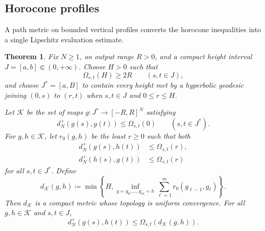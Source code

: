 \documentclass{amsart}
\numberwithin{equation}{section}
\theoremstyle{plain}
\newtheorem{theorem}{Theorem}[section]
\theoremstyle{definition}
\theoremstyle{remark}
\begin{document}
\subsection{Horocone profiles}

A path metric on bounded vertical profiles converts the horocone inequalities into a single Lipschitz evaluation estimate.

\begin{theorem}\label{thm:profile-path-metric}
Fix $N\ge1$, an output range $R>0$, and a compact height interval $J=[a,b]\Subset(0,+\infty)$.  Choose $H>0$ such that
\begin{equation}\label{eq:H-output-cutoff} \Omega_{s,t}(H)\ge2R \qquad(s,t\in J), \end{equation}
and choose $J^*=[a,B]$ to contain every height met by a hyperbolic geodesic joining $(0,s)$ to $(r,t)$ when $s,t\in J$ and $0\le r\le H$.

Let $\mathscr K$ be the set of maps $g\colon J^*\to[-R,R]^N$ satisfying
\begin{equation}\label{eq:vertical-profile-constraint} d_N^+(g(s),g(t))\le\Omega_{s,t}(0) \qquad(s,t\in J^*). \end{equation}
For $g,h\in\mathscr K$, let $r_0(g,h)$ be the least $r\ge0$ such that both
\begin{align*}
 d_N^+(g(s),h(t))&\le\Omega_{s,t}(r),\\
 d_N^+(h(s),g(t))&\le\Omega_{s,t}(r)
\end{align*}
for all $s,t\in J^*$.  Define
\begin{equation}\label{eq:profile-path-metric} d_{\mathscr K}(g,h) \coloneqq\min\left\{H, \inf_{g=g_0,\ldots,g_m=h} \sum_{\ell=1}^mr_0(g_{\ell-1},g_\ell)\right\}. \end{equation}
Then $d_{\mathscr K}$ is a compact metric whose topology is uniform convergence.  For all $g,h\in\mathscr K$ and $s,t\in J$,
\begin{equation}\label{eq:evaluation-cone-inequality} d_N^+(g(s),h(t)) \le\Omega_{s,t}(d_{\mathscr K}(g,h)). \end{equation}
\end{theorem}
\end{document}
